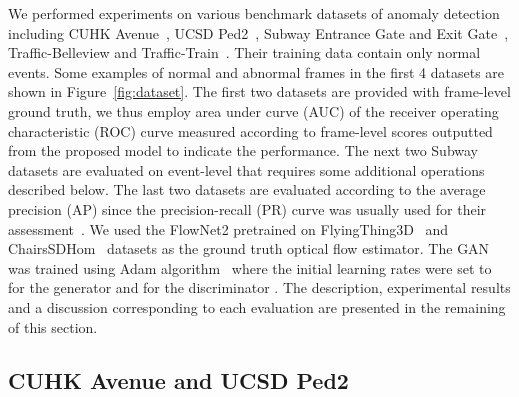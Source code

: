 \documentclass[10pt,twocolumn,letterpaper]{article}
\begin{document}
We performed experiments on various benchmark datasets of anomaly detection including CUHK Avenue~\cite{Lu2013Abnormal}, UCSD Ped2~\cite{Li2014Anomaly}, Subway Entrance Gate and Exit Gate~\cite{Adam2008Robust}, Traffic-Belleview and Traffic-Train~\cite{Zaharescu2010Anomalous}. Their training data contain only normal events. Some examples of normal and abnormal frames in the first 4 datasets are shown in Figure~\ref{fig:dataset}. The first two datasets are provided with frame-level ground truth, we thus employ area under curve (AUC) of the receiver operating characteristic (ROC) curve measured according to frame-level scores outputted from the proposed model to indicate the performance. The next two Subway datasets are evaluated on event-level that requires some additional operations described below. The last two datasets are evaluated according to the average precision (AP) since the precision-recall (PR) curve was usually used for their assessment~\cite{Zaharescu2010Anomalous,Xu2017Detecting}. We used the FlowNet2 pretrained on FlyingThing3D~\cite{Mayer2016A} and ChairsSDHom~\cite{Eddy2017Flownet2} datasets as the ground truth optical flow estimator. The GAN was trained using Adam algorithm~\cite{Diederik2014Adam} where the initial learning rates were set to  for the generator  and  for the discriminator . The description, experimental results and a discussion corresponding to each evaluation are presented in the remaining of this section.

\subsection{CUHK Avenue and UCSD Ped2}
\end{document}

